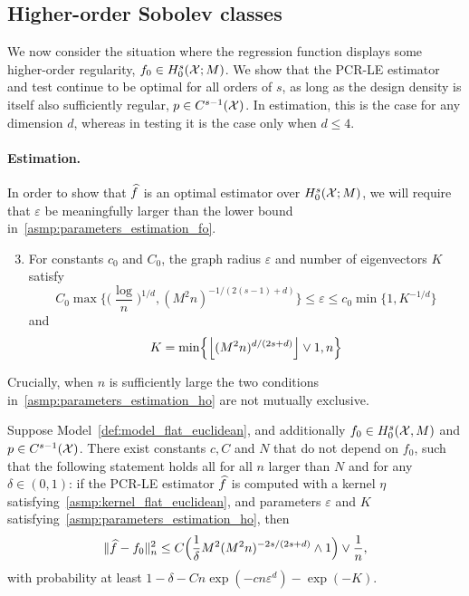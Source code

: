 \subsection{Higher-order Sobolev classes}
\label{sec:higher_order_sobolev_classes}
We now consider the situation where the regression function displays some higher-order regularity, $f_0 \in H_0^s(\mathcal{X};M)$. We show that the PCR-LE estimator and test continue to be optimal for all orders of $s$, as long as the design density is itself also sufficiently regular, $p \in C^{s - 1}(\mathcal{X})$. In estimation, this is the case for any dimension $d$, whereas in testing it is the case only when $d \leq 4$. 

\paragraph{Estimation.}
In order to show that $\widehat{f}$ is an optimal estimator over $H_0^s(\mathcal{X};M)$, we will require that $\varepsilon$ be meaningfully larger than the lower bound in~\ref{asmp:parameters_estimation_fo}.
\begin{enumerate}[label=(P\arabic*)]
	\setcounter{enumi}{2}
	\item 
	\label{asmp:parameters_estimation_ho}
	For constants $c_0$ and $C_0$, the graph radius $\varepsilon$ and number of eigenvectors $K$ satisfy
	\begin{equation}
	\label{eqn:radius_ho}
	C_0\max\biggl\{\biggl(\frac{\log}{n}\biggr)^{1/d}, (M^2n)^{-1/(2(s - 1) + d)}\biggr\} \leq \varepsilon \leq c_0\min\{1, K^{-1/d}\}
	\end{equation}
	and
	\begin{equation*}
	K = \min\Bigl\{\left\lfloor (M^2n)^{d/(2s + d)} \right\rfloor \vee 1,n\Bigr\}
	\end{equation*}
\end{enumerate}
Crucially, when $n$ is sufficiently large the two conditions in~\ref{asmp:parameters_estimation_ho} are not mutually exclusive.
\begin{theorem}
	\label{thm:laplacian_eigenmaps_estimation_ho}
	Suppose Model~\ref{def:model_flat_euclidean}, and additionally $f_0 \in H_0^s(\mathcal{X},M)$ and $p \in C^{s - 1}(\mathcal{X})$. There exist constants $c,C$ and $N$ that do not depend on $f_0$, such that the following statement holds all for all $n$ larger than $N$ and for any $\delta \in (0,1)$: if the PCR-LE estimator $\widehat{f}$ is computed with a kernel $\eta$ satisfying~\ref{asmp:kernel_flat_euclidean}, and parameters $\varepsilon$ and $K$ satisfying~\ref{asmp:parameters_estimation_ho}, then
	\begin{equation}
	\label{eqn:laplacian_eigenmaps_estimation_ho}
	\|\widehat{f} - f_0\|_n^2 \leq C\Bigl(\frac{1}{\delta}M^2(M^2n)^{-2s/(2s + d)} \wedge 1\Bigr) \vee \frac{1}{n},
	\end{equation}
	with probability at least $1 - \delta - Cn\exp(-cn\varepsilon^d) - \exp(-K)$.
\end{theorem}
